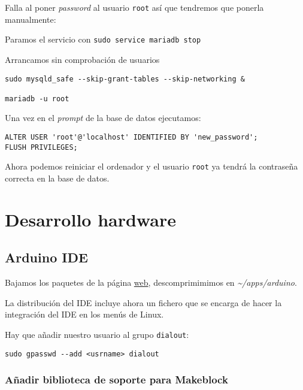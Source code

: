 \documentclass[
  12pt,
  spanish,
]{article}
\begin{document}
Falla al poner \emph{password} al usuario \texttt{root} así que
tendremos que ponerla manualmente:

Paramos el servicio con \texttt{sudo\ service\ mariadb\ stop}

Arrancamos sin comprobación de usuarios

\begin{verbatim}
sudo mysqld_safe --skip-grant-tables --skip-networking &

mariadb -u root
\end{verbatim}

Una vez en el \emph{prompt} de la base de datos ejecutamos:

\begin{verbatim}
ALTER USER 'root'@'localhost' IDENTIFIED BY 'new_password';
FLUSH PRIVILEGES;
\end{verbatim}

Ahora podemos reiniciar el ordenador y el usuario \texttt{root} ya
tendrá la contraseña correcta en la base de datos.

\hypertarget{desarrollo-hardware}{%
\section{Desarrollo hardware}\label{desarrollo-hardware}}

\hypertarget{arduino-ide}{%
\subsection{Arduino IDE}\label{arduino-ide}}

Bajamos los paquetes de la página \href{https://www.arduino.cc}{web},
descomprimimimos en \emph{\textasciitilde/apps/arduino}.

La distribución del IDE incluye ahora un fichero que se encarga de hacer
la integración del IDE en los menús de Linux.

Hay que añadir nuestro usuario al grupo \texttt{dialout}:

\begin{verbatim}
sudo gpasswd --add <usrname> dialout
\end{verbatim}

\hypertarget{auxf1adir-biblioteca-de-soporte-para-makeblock}{%
\subsubsection{Añadir biblioteca de soporte para
Makeblock}\label{auxf1adir-biblioteca-de-soporte-para-makeblock}}
\end{document}
